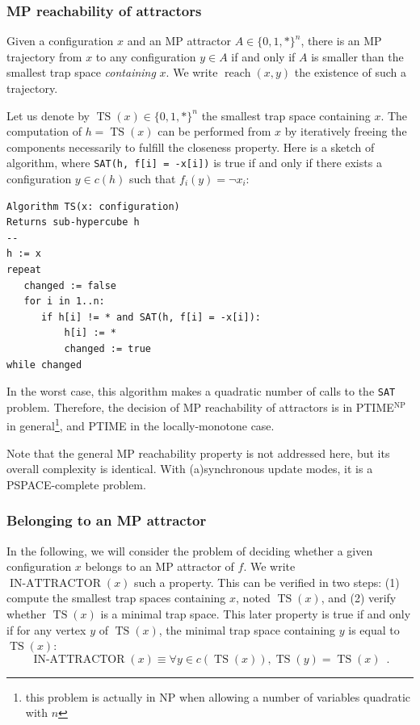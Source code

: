 \documentclass[PCJ,Unicode,screen,mode=plain]{cedram}
\begin{document}
\hypertarget{mp-reachability-of-attractors}{%
\subsubsection{MP reachability of
attractors}\label{mp-reachability-of-attractors}}

Given a configuration \(x\) and an MP attractor \(A\in \{0,1,*\}^n\),
there is an MP trajectory from \(x\) to any configuration \(y\in A\) if
and only if \(A\) is smaller than the smallest trap space
\emph{containing} \(x\). We write \(\operatorname{reach}(x,y)\) the
existence of such a trajectory.

Let us denote by \(\operatorname{TS}(x) \in \{0,1,*\}^n\) the smallest
trap space containing \(x\). The computation of
\(h=\operatorname{TS}(x)\) can be performed from \(x\) by iteratively
freeing the components necessarily to fulfill the closeness property.
Here is a sketch of algorithm, where
\texttt{SAT(h,\ f{[}i{]}\ =\ -x{[}i{]})} is true if and only if there
exists a configuration \(y\in c(h)\) such that \(f_i(y)=\neg x_i\):

\begin{verbatim}
Algorithm TS(x: configuration)
Returns sub-hypercube h
--
h := x
repeat
   changed := false
   for i in 1..n:
      if h[i] != * and SAT(h, f[i] = -x[i]):
          h[i] := *
          changed := true
while changed
\end{verbatim}

In the worst case, this algorithm makes a quadratic number of calls to
the \texttt{SAT} problem. Therefore, the decision of MP reachability of
attractors is in PTIME\(^\text{NP}\) in general\footnote{this problem is
  actually in NP when allowing a number of variables quadratic with
  \(n\)}, and PTIME in the locally-monotone case.

Note that the general MP reachability property is not addressed here,
but its overall complexity is identical. With (a)synchronous update
modes, it is a PSPACE-complete problem.

\hypertarget{belonging-to-an-mp-attractor}{%
\subsubsection{Belonging to an MP
attractor}\label{belonging-to-an-mp-attractor}}

In the following, we will consider the problem of deciding whether a
given configuration \(x\) belongs to an MP attractor of \(f\). We write
\(\operatorname{IN-ATTRACTOR}(x)\) such a property. This can be verified
in two steps: (1) compute the smallest trap spaces containing \(x\),
noted \(\operatorname{TS}(x)\), and (2) verify whether
\(\operatorname{TS}(x)\) is a minimal trap space. This later property is
true if and only if for any vertex \(y\) of \(\operatorname{TS}(x)\),
the minimal trap space containing \(y\) is equal to
\(\operatorname{TS}(x)\): \[
\operatorname{IN-ATTRACTOR}(x) \equiv \forall y \in c(\operatorname{TS}(x)), \operatorname{TS}(y) = \operatorname{TS}(x) \enspace.
\]
\end{document}
